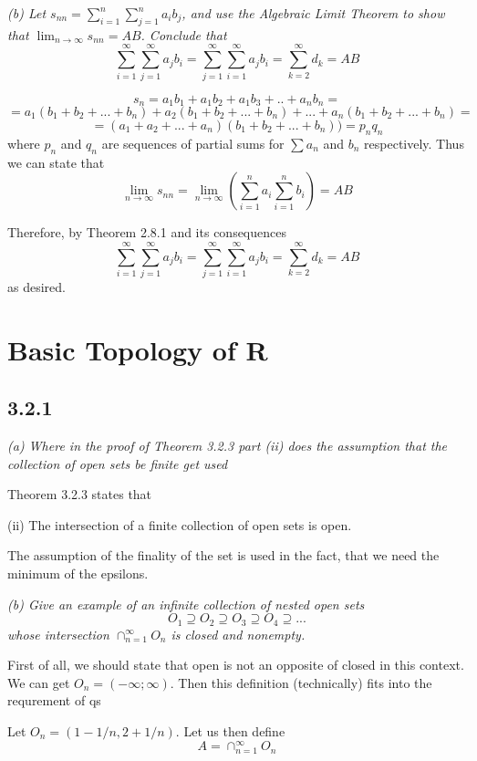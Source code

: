 \documentclass[11pt,oneside,titlepage]{book}
\begin{document}
\textit{(b) Let $s_{nn} = \sum_{i = 1}^n\sum_{j = 1}^n a_i b_j$, and use the
  Algebraic Limit Theorem to show that $\lim_{n \to \infty} s_{nn} = AB$.
  Conclude that }
$$\sum_{i = 1}^{\infty} \sum_{j = 1}^{\infty} a_j b_i =
\sum_{j = 1}^{\infty} \sum_{i = 1}^{\infty} a_j b_i =
\sum_{k = 2}^{\infty}  d_k = AB$$

$$s_n = a_1 b_1 + a_1 b_2 + a_1 b_3 + .. + a_n b_n = $$
$$= a_1 (b_1 + b_2 + ... + b_n) + a_2 (b_1 + b_2 + ... + b_n) + ...
+ a_n(b_1 + b_2 + ... + b_n) = $$
$$= (a_1 + a_2 + ... + a_n)(b_1 + b_2 + ... + b_n)) = p_n q_n$$
where $p_n$ and $q_n$ are sequences of partial sums for $\sum a_n$ and
$b_n$ respectively. Thus we can state that
$$\lim_{n \to \infty} s_{nn} = \lim_{n \to \infty} (\sum_{i = 1}^{n} a_i 
\sum_{i = 1}^{n} b_i) = AB$$

Therefore, by Theorem 2.8.1 and its consequences
$$\sum_{i = 1}^{\infty} \sum_{j = 1}^{\infty} a_j b_i =
\sum_{j = 1}^{\infty} \sum_{i = 1}^{\infty} a_j b_i =
\sum_{k = 2}^{\infty}  d_k = AB$$
as desired.



\chapter{Basic Topology of R}

\section*{3.2.1}
\textit{(a) Where in the proof of Theorem 3.2.3 part (ii) does the assumption
  that the collection of open sets be finite get used}

Theorem 3.2.3 states that

(ii) The intersection of a finite collection of open sets is open.

The assumption of the finality of the set is used in the fact, that we need
the minimum of the epsilons.

\textit{(b) Give an example of an infinite collection of nested open sets}
$$ O_1 \supseteq O_2 \supseteq O_3 \supseteq O_4 \supseteq ... $$
\textit{whose intersection $\cap_{n = 1}^{\infty} O_n$ is closed and nonempty.}

First of all, we should state that open is not an opposite of closed in this
context. We can get $O_n = (-\infty; \infty)$. Then this definition
(technically) fits into the requrement of qs

Let $O_n = (1 - 1/n, 2 + 1/n)$. Let us then define 
$$A = \cap_{n = 1}^{\infty} O_n$$
\end{document}
